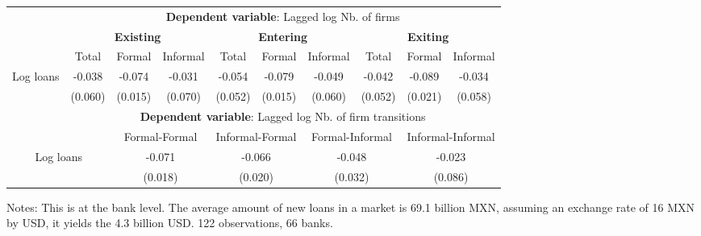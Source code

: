 \centering
\begin{threeparttable}
\begin{tabular}{lccccccccc}
\toprule
& \multicolumn{9}{c}{\textbf{Dependent variable}: Lagged log Nb. of firms} \\
\cmidrule(lr){2-10}
 & \multicolumn{3}{c}{\textbf{Existing}} & \multicolumn{3}{c}{\textbf{Entering}} & \multicolumn{3}{c}{\textbf{Exiting}} \\
\cmidrule(lr){2-10}
& Total 
& Formal 
& \multicolumn{1}{c}{Informal}
& Total 
& Formal 
& \multicolumn{1}{c}{Informal}
& Total 
& Formal 
& Informal \\
\midrule
Log loans 
&  -0.038  & -0.074  & -0.031   &  -0.054  & -0.079   & -0.049  & -0.042   & -0.089   & -0.034 \\
& (0.060) & (0.015) & (0.070) & (0.052) & (0.015) & (0.060) & (0.052) & (0.021) & (0.058) \\
\midrule


& \multicolumn{9}{c}{\textbf{Dependent variable}: Lagged log Nb. of firm transitions} \\
\cmidrule(lr){3-10}
\multicolumn{2}{c}{} & \multicolumn{2}{c}{Formal-Formal} & \multicolumn{2}{c}{Informal-Formal} & \multicolumn{2}{c}{Formal-Informal} & \multicolumn{2}{c}{Informal-Informal} \\
\midrule 
\multicolumn{2}{c}{Log loans} & \multicolumn{2}{c}{-0.071} & \multicolumn{2}{c}{-0.066} & \multicolumn{2}{c}{-0.048} & \multicolumn{2}{c}{-0.023} \\
\multicolumn{2}{c}{} & \multicolumn{2}{c}{(0.018)} & \multicolumn{2}{c}{(0.020)} & \multicolumn{2}{c}{(0.032)} & \multicolumn{2}{c}{(0.086)} \\

\bottomrule
\end{tabular}
\begin{tablenotes}[flushleft]
\tiny
\item Notes: This is at the bank level. The average amount of new loans in a market is 69.1 billion MXN, assuming an exchange rate of 16 MXN by USD, it yields the 4.3 billion USD. 122 observations, 66 banks.
\end{tablenotes}
\end{threeparttable}
